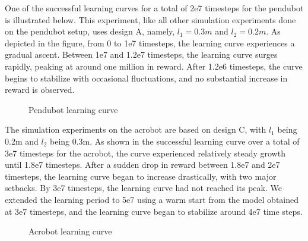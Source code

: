 One of the successful learning curves for a total of 2e7 timesteps for the pendubot is illustrated below. This experiment, like all other simulation experiments done on the pendubot setup, uses design A, namely, $l_1 = 0.3m$ and $l_2 = 0.2m$. As depicted in the figure, from 0 to 1e7 timesteps, the learning curve experiences a gradual ascent. Between 1e7 and 1.2e7 timesteps, the learning curve surges rapidly, peaking at around one million in reward. After 1.2e6 timesteps, the curve begins to stabilize with occasional fluctuations, and no substantial increase in reward is observed.

\begin{figure}[H]
    \centering
    \caption{Pendubot learning curve}
    \label{fig:image_a}
\end{figure}

The simulation experiments on the acrobot are based on design C, with $l_1$ being 0.2m and $l_2$ being 0.3m. As shown in the successful learning curve over a total of 3e7 timesteps for the acrobot, the curve experienced relatively steady growth until 1.8e7 timesteps. After a sudden drop in reward between 1.8e7 and 2e7 timesteps, the learning curve began to increase drastically, with two major setbacks. By 3e7 timesteps, the learning curve had not reached its peak. We extended the learning period to 5e7 using a warm start from the model obtained at 3e7 timesteps, and the learning curve began to stabilize around 4e7 time steps.

\begin{figure}[H]
    \centering
    \caption{Acrobot learning curve}
    \label{fig:image_b}
\end{figure}

